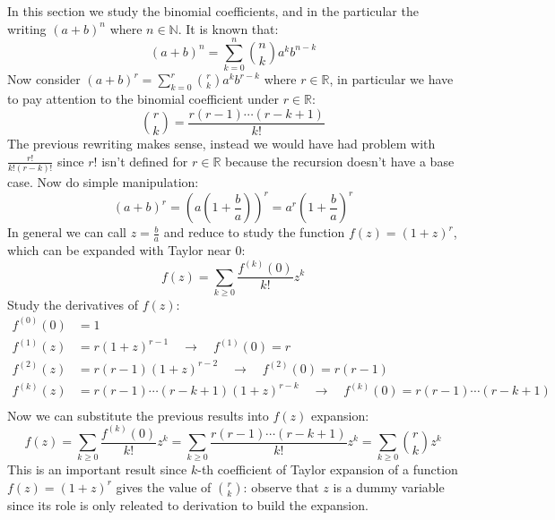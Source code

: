 In this section we study the binomial coefficients, and in the
particular the writing $(a + b)^n$ where $n\in \mathbb{N}$. It is known that:
\begin{displaymath}
  (a+b)^n = \sum_{k=0}^{n}{{{n}\choose{k}}a^k b^{n-k} }
\end{displaymath}
Now consider $(a + b)^r = \sum_{k=0}^{r}{{{r}\choose{k}}a^k b^{r-k} }$ where
$r\in \mathbb{R}$, in particular we have to pay attention to the
binomial coefficient under $r\in \mathbb{R}$:
\begin{displaymath}
  {{r}\choose{k}}  = \frac{r(r-1)\cdots(r-k+1)}{k!}
\end{displaymath}
The previous rewriting makes sense, instead we would have had problem
with $ \frac{r!}{k!(r-k)!} $ since $r!$ isn't defined for $r \in \mathbb{R}$
because the recursion doesn't have a base case.
Now do simple manipulation:
\begin{displaymath}
  (a+b)^r = \left( a\left(1 +  \frac{b}{a}\right)\right)^r =
  a^r \left(1 +  \frac{b}{a}\right)^r
\end{displaymath}
In general we can call $z= \frac{b}{a} $ and reduce to study the
function $f(z)=(1+z)^r$, which can be expanded with Taylor near $0$:
\begin{displaymath}
  f(z) = \sum_{k \geq 0}{ \frac{f^{(k)}(0)}{k!} z^k }
\end{displaymath}
Study the derivatives of $f(z)$:
\begin{displaymath}
  \begin{split}
    f^{(0)}(0) &= 1 \\
    f^{(1)}(z) &= r(1+z)^{r-1} \quad \rightarrow
    \quad f^{(1)}(0) =    r\\
    f^{(2)}(z) &= r(r-1)(1+z)^{r-2} \quad \rightarrow
    \quad f^{(2)}(0) = r(r-1)\\
    f^{(k)}(z) &= r(r-1)\cdots(r-k+1)(1+z)^{r-k}
    \quad \rightarrow \quad f^{(k)}(0) = r(r-1)\cdots(r-k+1)\\
  \end{split}
\end{displaymath}
Now we can substitute the previous results into $f(z)$ expansion:
\begin{displaymath}
  f(z) = \sum_{k \geq 0}{ \frac{f^{(k)}(0)}{k!} z^k } =
  \sum_{k \geq 0}{ \frac{r(r-1)\cdots(r-k+1)}{k!} z^k } =
  \sum_{k \geq 0}{ {{r}\choose{k}} z^k }
\end{displaymath}
This is an important result since $k$-th coefficient of Taylor
expansion of a function $f(z) = (1+z)^r$ gives the value of ${{r} \choose {k}}$:
observe that $z$ is a dummy variable since its role is only releated to
derivation to build the expansion.

